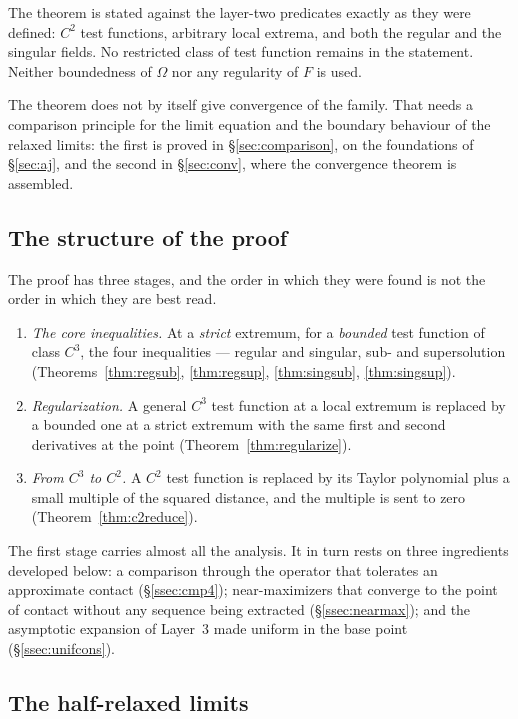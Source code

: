 \documentclass[11pt,reqno]{amsart}
\theoremstyle{plain}
\theoremstyle{definition}
\begin{document}
The theorem is stated against the layer-two predicates exactly as they were
defined: $C^2$ test functions, arbitrary local extrema, and both the regular
and the singular fields. No restricted class of test function remains in the
statement. Neither boundedness of $\Omega$ nor any regularity of $F$ is used.

The theorem does not by itself give convergence of the family. That needs a
comparison principle for the limit equation and the boundary behaviour of the
relaxed limits: the first is proved in \S\ref{sec:comparison}, on the
foundations of \S\ref{sec:aj}, and the second in \S\ref{sec:conv}, where the
convergence theorem is assembled.

\subsection{The structure of the proof}\label{ssec:structure4}

The proof has three stages, and the order in which they were found is not the
order in which they are best read.
\begin{enumerate}
  \item \emph{The core inequalities.} At a \emph{strict} extremum, for a
        \emph{bounded} test function of class $C^3$, the four inequalities ---
        regular and singular, sub- and supersolution
        (Theorems~\ref{thm:regsub}, \ref{thm:regsup}, \ref{thm:singsub},
        \ref{thm:singsup}).
  \item \emph{Regularization.} A general $C^3$ test function at a local
        extremum is replaced by a bounded one at a strict extremum with the
        same first and second derivatives at the point
        (Theorem~\ref{thm:regularize}).
  \item \emph{From $C^3$ to $C^2$.} A $C^2$ test function is replaced by its
        Taylor polynomial plus a small multiple of the squared distance, and
        the multiple is sent to zero (Theorem~\ref{thm:c2reduce}).
\end{enumerate}
The first stage carries almost all the analysis. It in turn rests on three
ingredients developed below: a comparison through the operator that tolerates
an approximate contact (\S\ref{ssec:cmp4}); near-maximizers that converge to the
point of contact without any sequence being extracted (\S\ref{ssec:nearmax});
and the asymptotic expansion of Layer~3 made uniform in the base point
(\S\ref{ssec:unifcons}).

\subsection{The half-relaxed limits}
\end{document}
